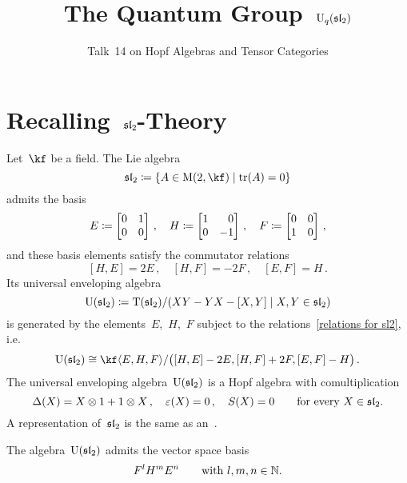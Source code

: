\documentclass[a4paper, 11pt, oneside]{scrartcl}
\title{The Quantum Group~$\operatorname{U}_q(\mathfrak{sl}_2)$}
\subtitle{Talk~14 on Hopf Algebras and Tensor Categories}
\author{}
\date{}
\begin{document}
\maketitle

\vspace{-4em}





\section{Recalling~$\mathfrak{sl}_2$-Theory}

Let~$\kf$ be a field.
The Lie algebra
\[
  \sllie_2
  \defined
  \{
    A \in \Mat(2, \kf)
  \suchthat
    \tr(A) = 0
  \}
\]
admits the basis
\[
  E
  \defined
  \begin{bmatrix}
    0 & 1 \\
    0 & 0
  \end{bmatrix} \,,
  \quad
  H
  \defined
  \begin{bmatrix*}[r]
    1 &  0 \\
    0 & -1
  \end{bmatrix*} \,,
  \quad
  F
  \defined
  \begin{bmatrix}
    0 & 0 \\
    1 & 0
  \end{bmatrix} \,,
\]
and these basis elements satisfy the commutator relations
\begin{equation}
  \label{relations for sl2}
  [H, E] = 2E \,,
  \quad
  [H, F] = -2F \,,
  \quad
  [E, F] = H \,.
\end{equation}
Its universal enveloping algebra
\[
  \Univ(\sllie_2)
  \defined
  \Tensor(\sllie_2)
  /
  \genideal{ XY - YX - [X,Y] \suchthat X, Y \in \sllie_2 }
\]
is generated by the elements~$E$,~$H$,~$F$ subject to the relations~\eqref{relations for sl2}, i.e.
\[
  \Univ(\sllie_2)
  \cong
  \kf\gen{E, H, F}
  /
  \genideal[\big]{[H,E] - 2E, [H,F] + 2F, [E,F] - H} \,.
\]
The universal enveloping algebra~$\operatorname{U}(\mathfrak{sl}_2)$ is a Hopf algebra with comultiplication
\[
  \Delta(X) = X \otimes 1 + 1 \otimes X \,,
  \quad
  \varepsilon(X) = 0 \,,
  \quad
  S(X) = 0
  \qquad
  \text{for every~$X \in \mathfrak{sl}_2$}.
\]
A representation of~$\mathfrak{sl}_2$ is the same as an~.

\begin{theorem}
  The algebra~$\operatorname{U}(\mathfrak{sl}_2)$ admits the vector space basis
  \[
    F^l H^m E^n
    \qquad
    \text{with~$l, m, n \in \mathbb{N}$.}
  \]
\end{theorem}
\end{document}
